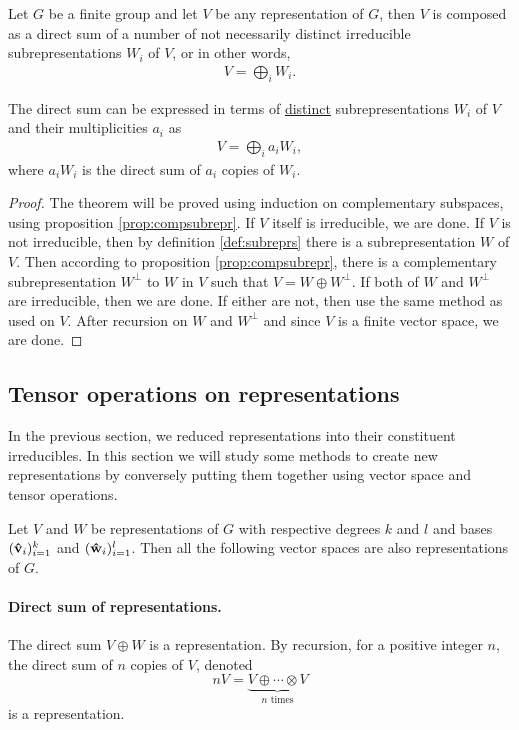 		\begin{theorem}\label{thm:maschke}
			Let $G$ be a finite group and let $V$ be any representation of $G$, then $V$ is composed as a direct sum of a number of not necessarily distinct irreducible subrepresentations $W_i$ of $V$, or in other words,
			\begin{align}
				V = \bigoplus_i W_i.
			\end{align}
			\begin{note}
				The direct sum can be expressed in terms of \underline{distinct} subrepresentations $W_i$ of $V$ and their multiplicities $a_i$ as
				\begin{align}
					V = \bigoplus_i a_i W_i,
				\end{align}
				where $a_i W_i$ is the direct sum of $a_i$ copies of $W_i$.
			\end{note}
		\end{theorem}
		\begin{proof}
			The theorem will be proved using induction on complementary subspaces, using proposition \ref{prop:compsubrepr}. If $V$ itself is irreducible, we are done. If $V$ is not irreducible, then by definition \ref{def:subreprs} there is a subrepresentation $W$ of $V$. Then according to proposition \ref{prop:compsubrepr}, there is a complementary subrepresentation $W^\perp$ to $W$ in $V$ such that $V = W \oplus W^\perp$. If both of $W$ and $W^\perp$ are irreducible, then we are done. If either are not, then use the same method as used on $V$. After recursion on $W$ and $W^\perp$ and since $V$ is a finite vector space, we are done.
		\end{proof}
	
	\subsection{Tensor operations on representations}
	
	In the previous section, we reduced representations into their constituent irreducibles. In this section we will study some methods to create new representations by conversely putting them together using vector space and tensor operations.
	
	Let $V$ and $W$ be representations of $G$ with respective degrees $k$ and $l$ and bases $(\mathbf{\hat{v}}_i)_{i=1}^k$ and $(\mathbf{\hat{w}}_i)_{i=1}^l$. Then all the following vector spaces are also representations of $G$.
	
	\paragraph{Direct sum of representations.} The direct sum $V \oplus W$ is a representation. By recursion, for a positive integer $n$, the direct sum of $n$ copies of $V$, denoted
	\[
		nV = \underset{n \text{ times}}{\underbrace{V \oplus \cdots \otimes V}}
	\]
	is a representation.
	
